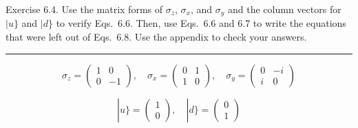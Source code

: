 \documentclass[12pt]{article}
\begin{document}
Exercise 6.4.
Use the matrix forms of $\sigma_z$, $\sigma_x$, and $\sigma_y$ and
the column vectors for $|u\}$ and $|d\}$ to verify Eqs.~6.6.
Then, use Eqs.~6.6 and 6.7 to write the equations that were left out
of Eqs.~6.8. Use the appendix to check your answers.

\bigskip
\hrule

\bigskip
\begin{equation*}
\sigma_z=\begin{pmatrix}1&0\\0&-1\end{pmatrix},
\quad
\sigma_x=\begin{pmatrix}0&1\\1&0\end{pmatrix},
\quad
\sigma_y=\begin{pmatrix}0&-i\\ i&0\end{pmatrix}
\tag{3.20}
\end{equation*}

\begin{equation*}
|u\}=\begin{pmatrix}1\\0\end{pmatrix},
\quad
|d\}=\begin{pmatrix}0\\1\end{pmatrix}
\end{equation*}
\end{document}
